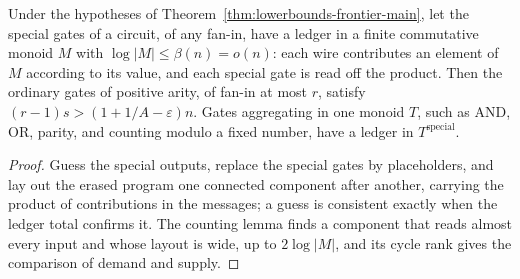 \begin{theorem}
  \label{thm:lowerbounds-frontier-ledger}
  \leanok
  Under the hypotheses of Theorem~\ref{thm:lowerbounds-frontier-main}, let the
  special gates of a circuit, of any fan-in, have a ledger in a finite commutative
  monoid $M$ with $\log|M|\le\beta(n)=o(n)$: each wire contributes an element of
  $M$ according to its value, and each special gate is read off the product. Then
  the ordinary gates of positive arity, of fan-in at most $r$, satisfy
  $(r-1)s>(1+1/A-\varepsilon)n$. Gates aggregating in one monoid $T$, such as
  AND, OR, parity, and counting modulo a fixed number, have a ledger in
  $T^{\text{special}}$.
\end{theorem}
\begin{proof}
  \leanok
  Guess the special outputs, replace the special gates by placeholders, and lay
  out the erased program one connected component after another, carrying the
  product of contributions in the messages; a guess is consistent exactly when the
  ledger total confirms it. The counting lemma finds a component that reads almost
  every input and whose layout is wide, up to $2\log|M|$, and its cycle rank gives
  the comparison of demand and supply.
\end{proof}

